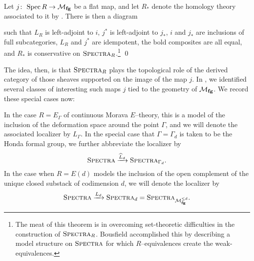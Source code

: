 \begin{theorem}\label{BousfieldLocalizationThm}
Let \(j\colon\thinspace \operatorname{Spec} R \to \mathcal{M}_{\mathbf{fg}}\) be a flat map, and let \(R_*\) denote the homology theory associated to it by .  There is then a diagram
\begin{center}
\end{center}
such that \(L_R\) is left-adjoint to \(i\), \(j^*\) is left-adjoint to \(j_*\), \(i\) and \(j_*\) are inclusions of full subcategories, \(L_R\) and \(j^*\) are idempotent, the bold composites are all equal, and \(R_*\) is conservative on \(\normalfont\textsc{Spectra}_R\).\footnote{The meat of this theorem is in overcoming set-theoretic difficulties in the construction of \(\normalfont\textsc{Spectra}_R\).  Bousfield accomplished this by describing a model structure on \(\normalfont\textsc{Spectra}\) for which \(R\)--equivalences create the weak-equivalences.} \qed
\end{theorem}

The idea, then, is that \(\normalfont\textsc{Spectra}_R\) plays the topological role of the derived category of those sheaves supported on the image of the map \(j\).  In , we identified several classes of interesting such maps \(j\) tied to the geometry of \(\mathcal{M}_{\mathbf{fg}}\).  We record these special cases now:
\begin{definition}
In the case \(R = E_\Gamma\) of continuous Morava \(E\)--theory, this is a model of the inclusion of the deformation space around the point \(\Gamma\), and we will denote the associated localizer by \(L_\Gamma\).  In the special case that \(\Gamma = \Gamma_d\) is taken to be the Honda formal group, we further abbreviate the localizer by \[\normalfont\textsc{Spectra} \xrightarrow{\widehat L_d} \normalfont\textsc{Spectra}_{\Gamma_d}.\]  In the case when \(R = E(d)\) models the inclusion of the open complement of the unique closed substack of codimension \(d\), we will denote the localizer by \[\normalfont\textsc{Spectra} \xrightarrow{L_d} \normalfont\textsc{Spectra}_d = \normalfont\textsc{Spectra}_{\mathcal{M}_{\mathbf{fg}}^{\le d}}.\]
\end{definition}

